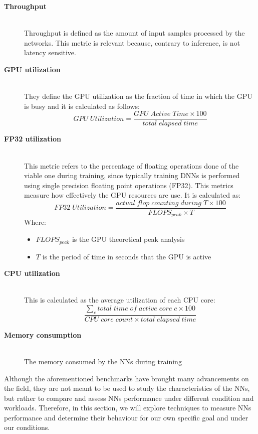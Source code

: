 \begin{description}
  \item[\textbf{Throughput}] \hfill\\ Throughput is defined as the amount of input samples processed by the networks. This metric is relevant because, contrary to inference, is not latency sensitive.   
  \item[\textbf{GPU utilization}] \hfill \\ They define the GPU utilization as the fraction of time in which the GPU is busy and it is calculated as follows:
  \begin{equation}
      GPU\;Utilization = \dfrac{GPU\;Active\;Time\times100}{total\;elapsed\;time}%
  \end{equation}
  
  \item[\textbf{FP32 utilization}] \hfill \\ This metric refers to the percentage of floating operations done of the viable one during training, since typically training DNNs is performed using single precision floating point operations (FP32). This metrics measure how effectively the GPU resources are use. It is calculated as:
  \begin{equation}
      FP32\;Utilization = \dfrac{actual\;flop\;counting\;during\;T\times100}{FLOPS_{peak} \times T}%
  \end{equation}
  Where:
  \begin{itemize}
  \item $FLOPS_{peak}$ is the GPU theoretical peak analysis
  \item $T$ is the period of time in seconds that the GPU is active
  \end{itemize}
  \item[\textbf{CPU utilization }] \hfill\\ This is calculated as the average utilization of each CPU core:
  \begin{equation}
      \dfrac{\sum_{c} total\;time\;of\;active\;core\;c \times 100}{CPU\;core\;count \times total\;elapsed\;time}%
    \end{equation}   
    \item[\textbf{Memory consumption }] \hfill\\ The memory consumed by the NNs during training
\end{description}
Although the aforementioned benchmarks have brought many advancements on the field, they are not meant to be used to study the characteristics of the NNs, but rather to compare and assess NNs performance under different condition and workloads. Therefore, in this section, we will explore techniques to measure NNs performance and determine their behaviour for our own specific goal and under our conditions.  

